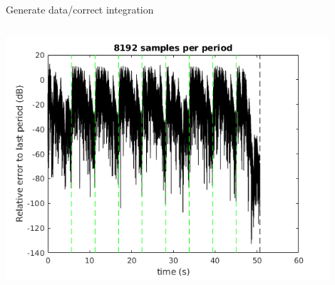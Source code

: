 \documentclass[9pt]{beamer}
\begin{document}
\begin{frame}{Generate data/correct integration}
\begin{columns}
\begin{column}{0.5\textwidth}
\begin{center}
        \includegraphics[width=0.9\textwidth]{fig/b1_A30_ms_full2_periodicity}
      \end{center}
    \end{column}
  \end{columns}
\end{frame}
\end{document}
